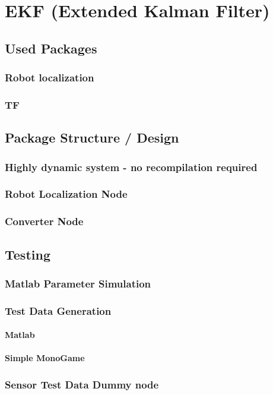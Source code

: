 \chapter{EKF (Extended Kalman Filter)}
\section{Used Packages}
\subsection{Robot localization}
\subsection{TF}
\section{Package Structure / Design}
\subsection{Highly dynamic system - no recompilation required}
\subsection{Robot Localization Node}
\subsection{Converter Node}
\section{Testing}
\subsection{Matlab Parameter Simulation}
\subsection{Test Data Generation}
\subsubsection{Matlab}
\subsubsection{Simple MonoGame}
\subsection{Sensor Test Data Dummy node}
